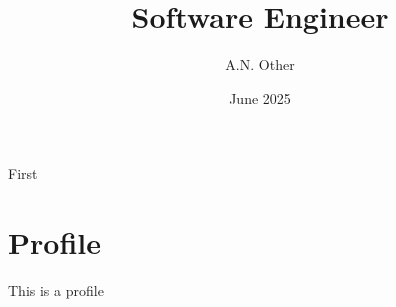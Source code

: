 \documentclass{smart-cv}
\author{A.N. Other}
\title{Software Engineer}
\date{June 2025}
\begin{document}
  \begin{two-col}
    {
      First
    }

    \section*{Profile}

    This is a profile
  \end{two-col}
\end{document}
